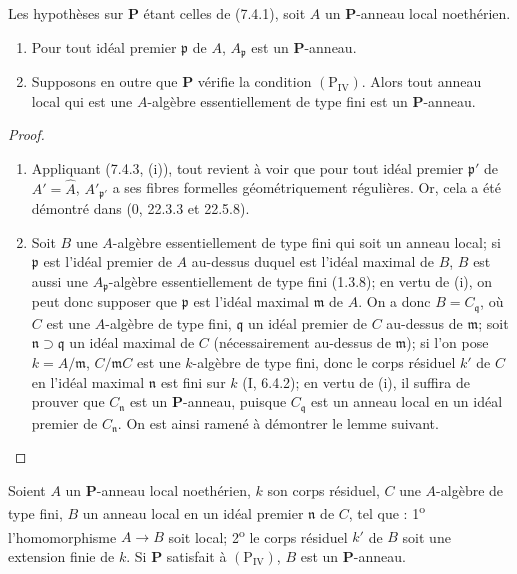 \begin{theorem}[7.4.4]
\label{IV.2.s7.4.4-fr}
Les hypothèses sur $\boldsymbol P$ étant celles de (7.4.1), soit $A$ un
$\boldsymbol P$-anneau local noethérien.
\begin{enumerate}
\item[\emph{(i)}] Pour tout idéal premier $\mathfrak p$ de $A$,
$A_{\mathfrak p}$ est un $\boldsymbol P$-anneau.
\item[\emph{(ii)}] Supposons en outre que $\boldsymbol P$ vérifie la condition
$(\mathrm P_{\mathrm{IV}})$. Alors tout anneau local qui est une
$A$-algèbre essentiellement de type fini est un $\boldsymbol P$-anneau.
\end{enumerate}
\end{theorem}

\begin{proof}
\begin{enumerate}
\item[\emph{(i)}] Appliquant (7.4.3, (i)), tout revient à voir que pour tout
idéal premier $\mathfrak p'$ de $A'=\widehat A$,
$A'_{\mathfrak p'}$ a ses fibres formelles géométriquement régulières. Or,
cela a été démontré dans (0, 22.3.3 et 22.5.8).


\item[\emph{(ii)}] Soit $B$ une $A$-algèbre essentiellement de type fini qui
soit un anneau local; si $\mathfrak p$ est l'idéal premier de $A$ au-dessus
duquel est l'idéal maximal de $B$, $B$ est aussi une
$A_{\mathfrak p}$-algèbre essentiellement de type fini (1.3.8); en vertu de
(i), on peut donc supposer que $\mathfrak p$ est l'idéal maximal $\mathfrak m$
de $A$. On a donc $B=C_{\mathfrak q}$, où $C$ est une $A$-algèbre de type
fini, $\mathfrak q$ un idéal premier de $C$ au-dessus de $\mathfrak m$; soit
$\mathfrak n\supset\mathfrak q$ un idéal maximal de $C$ (nécessairement
au-dessus de $\mathfrak m$); si l'on pose $k=A/\mathfrak m$,
$C/\mathfrak mC$ est une $k$-algèbre de type fini, donc le corps résiduel
$k'$ de $C$ en l'idéal maximal $\mathfrak n$ est fini sur $k$ (I, 6.4.2);
en vertu de (i), il suffira de prouver que $C_{\mathfrak n}$ est un
$\boldsymbol P$-anneau, puisque $C_{\mathfrak q}$ est un anneau local en un
idéal premier de $C_{\mathfrak n}$. On est ainsi ramené à démontrer le
lemme suivant.
\end{enumerate}
\end{proof}

\begin{lemma}[7.4.4.1]
\label{IV.2.s7.4.4.1-fr}
Soient $A$ un $\boldsymbol P$-anneau local noethérien, $k$ son corps
résiduel, $C$ une $A$-algèbre de type fini, $B$ un anneau local en un idéal
premier $\mathfrak n$ de $C$, tel que : 1\textsuperscript{o}
l'homomorphisme $A\to B$ soit local; 2\textsuperscript{o} le corps résiduel
$k'$ de $B$ soit une extension finie de $k$. Si $\boldsymbol P$ satisfait à
$(\mathrm P_{\mathrm{IV}})$, $B$ est un $\boldsymbol P$-anneau.
\end{lemma}

